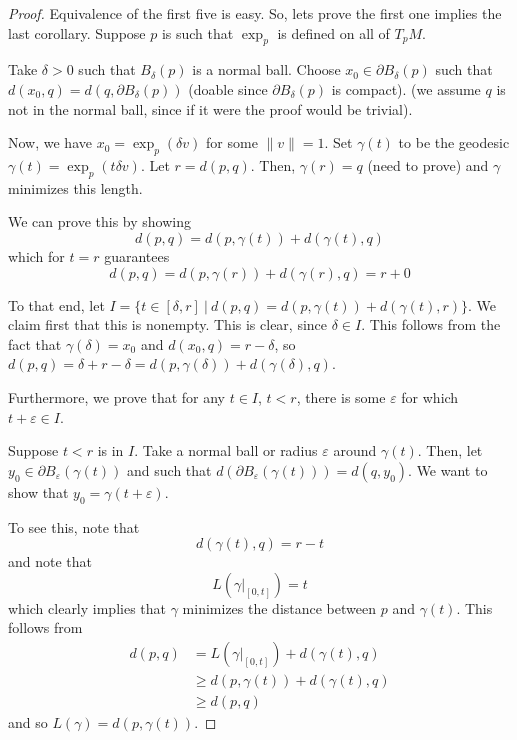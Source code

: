 \documentclass[../main.tex]{subfiles}
\begin{document}
\begin{proof}
    Equivalence of the first five is easy. So, lets prove the first one implies
    the last corollary. Suppose $p$ is such that $\exp_p$ is defined on all of
    $T_pM$.

    Take $\delta>0$ such that $B_{\delta}(p)$ is a normal ball. Choose
    $x_0\in\partial B_{\delta}(p)$ such that
    $d(x_0,q)=d(q,\partial B_{\delta}(p))$ (doable since $\partial
    B_{\delta}(p)$ is compact). (we assume $q$ is not in the normal ball, since
    if it were the proof would be trivial).

    Now, we have $x_0 = \exp_p(\delta v)$ for some $\|v\|=1$. Set $\gamma(t)$ to
    be the geodesic $\gamma(t) = \exp_p(t\delta v)$. Let $r=d(p,q)$. Then,
    $\gamma(r) = q$ (need to prove) and $\gamma$ minimizes this length.

    We can prove this by showing
    \[
        d(p,q) = d(p,\gamma(t))+d(\gamma(t),q)
    \]
    which for $t=r$ guarantees
    \[
        d(p,q) = d(p,\gamma(r)) + d(\gamma(r),q)
        =r+0
    \]

    To that end, let $I=\{t\in[\delta,r]\ |\ d(p,q) =
    d(p,\gamma(t))+d(\gamma(t),r)\}$. We claim first that this is nonempty.
    This is clear, since $\delta\in I$. This follows from the fact that
    $\gamma(\delta) = x_0$ and $d(x_0,q) = r-\delta$, so $d(p,q) = \delta +
    r-\delta = d(p,\gamma(\delta)) + d(\gamma(\delta),q)$.

    Furthermore, we prove that for any $t\in I$, $t<r$, there is some
    $\varepsilon$ for which $t+\varepsilon\in I$. 

    Suppose $t<r$ is in $I$. Take a normal ball or radius $\varepsilon$ around
    $\gamma(t)$. Then, let $y_0\in \partial B_{\varepsilon}(\gamma(t))$ and such
    that $d(\partial B_{\varepsilon}(\gamma(t))) = d(q,y_0)$. We want to show
    that $y_0 = \gamma(t+\varepsilon)$.

    To see this, note that 
    \[
        d(\gamma(t),q) = r-t
    \]
    and note that
    \[
        L(\gamma|_{[0,t]}) = t
    \]
    which clearly implies that $\gamma$ minimizes the distance between $p$ and
    $\gamma(t)$.
    This follows from
    \[
\begin{aligned}
    d(p,q) &= L(\gamma|_{[0,t]}) + d(\gamma(t),q)\\
    &\geq d(p,\gamma(t)) + d(\gamma(t),q)\\
    &\geq d(p,q)
\end{aligned}
    \]
    and so $L(\gamma) = d(p,\gamma(t))$.


\end{proof}
\end{document}
